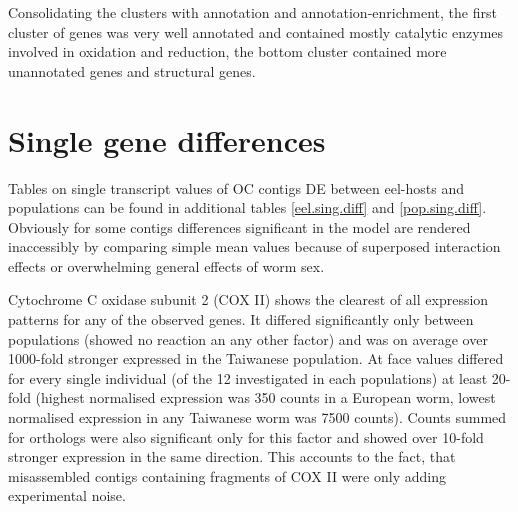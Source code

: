 Consolidating the clusters with annotation and annotation-enrichment,
the first cluster of genes was very well annotated and contained
mostly catalytic enzymes involved in oxidation and reduction, the
bottom cluster contained more unannotated genes and structural genes.

\section{Single gene differences}
\label{sec:single-gene-diff}

Tables on single transcript values of OC contigs DE between eel-hosts
and populations can be found in additional tables \ref{eel.sing.diff}
and \ref{pop.sing.diff}. Obviously for some contigs differences
significant in the model are rendered inaccessibly by comparing simple
mean values because of superposed interaction effects or overwhelming
general effects of worm sex.

Cytochrome C oxidase subunit 2 (COX II) shows the clearest of all
expression patterns for any of the observed genes. It differed
significantly only between populations (showed no reaction an any
other factor) and was on average over 1000-fold stronger expressed in
the Taiwanese population. At face values differed for every single
individual (of the 12 investigated in each populations) at least
20-fold (highest normalised expression was 350 counts in a European
worm, lowest normalised expression in any Taiwanese worm was 7500
counts). Counts summed for orthologs were also significant only for
this factor and showed over 10-fold stronger expression in the same
direction. This accounts to the fact, that misassembled contigs
containing fragments of COX II were only adding experimental noise.



